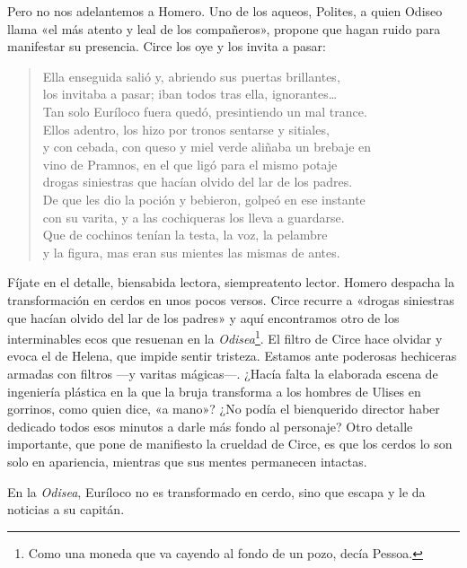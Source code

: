 Pero no nos adelantemos a Homero. Uno de los aqueos, Polites, a quien Odiseo llama «el más atento y leal de los compañeros», propone que hagan ruido para manifestar su presencia. Circe los oye y los invita a pasar:

\begin{verse}
Ella enseguida salió y, abriendo sus puertas brillantes,\\
los invitaba a pasar; iban todos tras ella, ignorantes…\\
Tan solo Euríloco fuera quedó, presintiendo un mal trance.\\
Ellos adentro, los hizo por tronos sentarse y sitiales,\\
y con cebada, con queso y miel verde aliñaba un brebaje en\\
vino de Pramnos, en el que ligó para el mismo potaje\\
drogas siniestras que hacían olvido del lar de los padres.\\
De que les dio la poción y bebieron, golpeó en ese instante\\
con su varita, y a las cochiqueras los lleva a guardarse.\\
Que de cochinos tenían la testa, la voz, la pelambre\\
y la figura, mas eran sus mientes las mismas de antes.
\end{verse}

Fíjate en el detalle, biensabida lectora, siempreatento lector. Homero despacha la transformación en cerdos en unos pocos versos. Circe recurre a «drogas siniestras que hacían olvido del lar de los padres» y aquí encontramos otro de los interminables ecos que resuenan en la \emph{Odisea}\footnote{Como una moneda que va cayendo al fondo de un pozo, decía Pessoa.}. El filtro de Circe hace olvidar y evoca el de Helena, que impide sentir tristeza. Estamos ante poderosas hechiceras armadas con filtros ---y varitas mágicas---. ¿Hacía falta la elaborada escena de ingeniería plástica en la que la bruja transforma a los hombres de Ulises en gorrinos, como quien dice, «a mano»? ¿No podía el bienquerido director haber dedicado todos esos minutos a darle más fondo al personaje? Otro detalle importante, que pone de manifiesto la crueldad de Circe, es que los cerdos lo son solo en apariencia, mientras que sus mentes permanecen intactas.

En la \emph{Odisea}, Euríloco no es transformado en cerdo, sino que escapa y le da noticias a su capitán.

